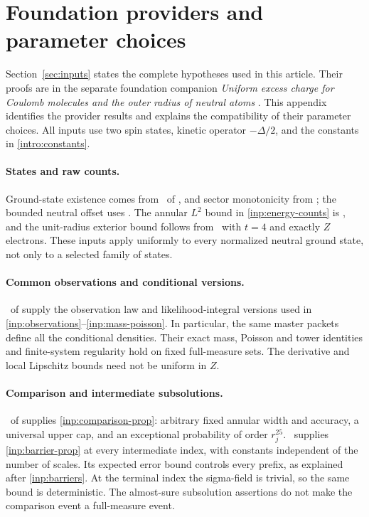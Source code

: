 \section{Foundation providers and parameter choices}\label{sec:interface}

Section~\ref{sec:inputs} states the complete hypotheses used in this
article.  Their proofs are in the separate foundation companion
\emph{Uniform excess charge for Coulomb molecules and the outer radius
of neutral atoms} \cite{OuterRadius}.  This appendix identifies the
provider results and explains the compatibility of their parameter
choices.  All inputs use two spin states, kinetic operator $-\Delta/2$,
and the constants in \eqref{intro:constants}.

\paragraph{States and raw counts.}
Ground-state existence comes from \FoundationBinding\ of
\cite{OuterRadius}, and sector monotonicity from \FoundationMonotonicity;
the bounded neutral offset uses \FoundationOffset.  The annular $L^2$ bound in
\cref{inp:energy-counts} is \FoundationCounts, and the unit-radius
exterior bound follows from \FoundationDeficit\ with $t=4$ and exactly
$Z$ electrons.  These inputs apply uniformly to every normalized neutral
ground state, not only to a selected family of states.

\paragraph{Common observations and conditional versions.}
\FoundationObservations\ of \cite{OuterRadius} supply the observation
law and likelihood-integral versions used in
\eqref{inp:observations}--\eqref{inp:mass-poisson}.  In particular, the
same master packets define all the conditional densities.  Their exact
mass, Poisson and tower identities and finite-system regularity hold
on fixed full-measure sets.  The derivative and local Lipschitz bounds
need not be uniform in $Z$.

\paragraph{Comparison and intermediate subsolutions.}
\FoundationComparison\ of \cite{OuterRadius} supplies
\cref{inp:comparison-prop}: arbitrary fixed annular width and accuracy,
a universal upper cap, and an exceptional probability of order
$r_j^{25}$.  \FoundationIntermediate\ supplies
\cref{inp:barrier-prop} at every intermediate index, with constants
independent of the number of scales.  Its expected error bound controls
every prefix, as explained after \eqref{inp:barriers}.  At the terminal
index the sigma-field is trivial, so the same bound is deterministic.
The almost-sure subsolution assertions do not make the comparison event
a full-measure event.

